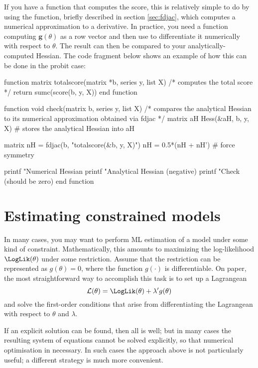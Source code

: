 If you have a function that computes the score, this is relatively
simple to do by using the  function, briefly described in
section \ref{sec:fdjac}, which computes a numerical approximation to a
derivative. In practice, you need a function computing
$\mathbf{g}(\theta)$ as a row vector and then use  to
differentiate it numerically with respect to $\theta$. The result can
then be compared to your analytically-computed Hessian. The code
fragment below shows an example of how this can be done in the probit
case:
\begin{code}
function matrix totalscore(matrix *b, series y, list X) 
    /* computes the total score */
    return sumc(score(b, y, X))
end function

function void check(matrix b, series y, list X)
    /* compares the analytical Hessian to its numerical
    approximation obtained via fdjac */
    matrix aH
    Hess(&aH, b, y, X) # stores the analytical Hessian into aH
    
    matrix nH = fdjac(b, "totalscore(&b, y, X)")
    nH = 0.5*(nH + nH') # force symmetry
    
    printf "Numerical Hessian\n%
    printf "Analytical Hessian (negative)\n%
    printf "Check (should be zero)\n%
end function
\end{code}

\section{Estimating constrained models}
\label{sec:mle-constr}

In many cases, you may want to perform ML estimation of a model under
some kind of constraint. Mathematically, this amounts to maximizing the
log-likelihood $\LogLik(\theta)$ under some restriction. Assume
that the restriction can be represented as $g(\theta) = 0$, where
the function $g(\cdot)$ is differentiable. On paper, the most
straightforward way to accomplish this task is to set up a Lagrangean
\[
  \mathcal{L}(\theta) = \LogLik(\theta) + \lambda' g(\theta)
\]
and solve the first-order conditions that arise from differentiating
the Lagrangean with respect to $\theta$ and $\lambda$.

If an explicit solution can be found, then all is well; but in many
cases the resulting system of equations cannot be solved explicitly,
so that numerical optimisation in necessary. In such cases the
approach above is not particularly useful; a different strategy is
much more convenient.

